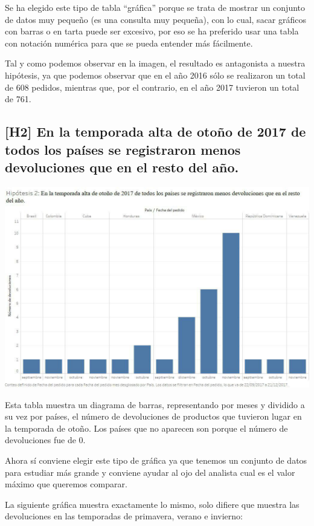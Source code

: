 \documentclass{article}
\begin{document}
Se ha elegido este tipo de tabla “gráfica” porque se trata de mostrar un conjunto de datos muy pequeño (es una consulta muy pequeña), con lo cual, sacar gráficos con barras o en tarta puede ser excesivo, por eso se ha preferido usar una tabla con notación numérica para que se pueda entender más fácilmente.  

Tal y como podemos observar en la imagen, el resultado es antagonista a nuestra hipótesis, ya que podemos observar que en el año 2016 sólo se realizaron un total de 608 pedidos, mientras que, por el contrario, en el año 2017 tuvieron un total de 761.  

\subsection{[H2] En la temporada alta de otoño de 2017 de todos los países se registraron menos devoluciones que en el resto del año.}

\begin{center}
\includegraphics[scale=0.5]{imagenes/Hipotesis2.jpg} 
\end{center}

Esta tabla muestra un diagrama de barras, representando por meses y dividido a su vez por países, el número de devoluciones de productos que tuvieron lugar en la temporada de otoño. Los países que no aparecen son porque el número de devoluciones fue de 0.  

Ahora sí conviene elegir este tipo de gráfica ya que tenemos un conjunto de datos para estudiar más grande y conviene ayudar al ojo del analista cual es el valor máximo que queremos comparar.  

La siguiente gráfica muestra exactamente lo mismo, solo difiere que muestra las devoluciones en las temporadas de primavera, verano e invierno:  
\end{document}
